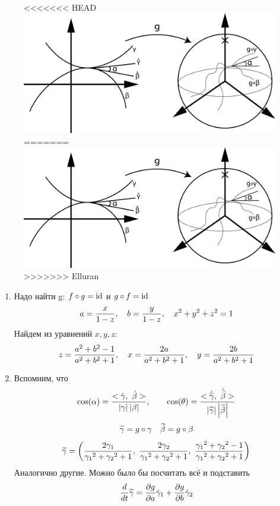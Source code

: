 \documentclass[12pt, fleqn]{article}
\begin{document}
\begin{sol} \
  \begin{figure}[H]
<<<<<<< HEAD
      \includegraphics[scale=0.18]{pics/7_1}
=======
      \includegraphics[scale=0.18]{pics/7_1.png}
>>>>>>> Elluran
      \centering
  \end{figure}
  \begin{enumerate}
    \item Надо найти g: $f \circ g = \mathop{\rm id}\nolimits$ и $g \circ f = \mathop{\rm id}\nolimits$
    \[a = \dfrac{x}{1-z},\quad b = \dfrac{y}{1-z},\quad x^2 + y^2 + z^2 = 1\]
    Найдем из уравнений $x,y,z$:
    \[z = \dfrac{a^2 + b^2 - 1}{a^2 + b^2 + 1},\quad
    x = \dfrac{2a}{a^2 + b^2 + 1},\quad
    y=\dfrac{2b}{a^2 + b^2 + 1}\]
    \item Вспомним, что
    \[\cos (\alpha) = \dfrac{<\dot{\gamma},\ \dot{\beta}>}{\abs{\gamma} \abs{\beta}},\qq
    \cos (\theta) = \dfrac{<\dot{\w{\gamma}},\ \dot{\w{\beta}}>}{\abs{\w{\gamma}} \abs{\w{\beta}}}\]
    \[\widetilde{\gamma} = g \circ \gamma\quad \widetilde{\beta} = g \circ \beta\]
    \[\widetilde{\gamma} = \left(
      \dfrac{2 \gamma_1}{{\gamma_1}^2 + {\gamma_2}^2 + 1},\
      \dfrac{2 \gamma_2}{{\gamma_1}^2 + {\gamma_2}^2 + 1},\
      \dfrac{{\gamma_1}^2 + {\gamma_2}^2 - 1}{{\gamma_1}^2 + {\gamma_2}^2 + 1}
    \right)\]
    Аналогично другие. Можно было бы посчитать всё и подставить
    \[\dfrac{d}{dt} \widetilde{\gamma} = \dfrac{\partial g}{\partial a} \dot{\gamma}_1 + \dfrac{\partial g}{\partial b} \dot{\gamma}_2\]

\end{enumerate}
\end{sol}
\end{document}
